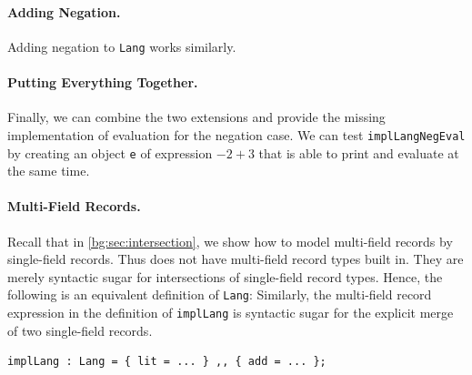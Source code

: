 \paragraph{Adding Negation.}
Adding negation to \lstinline{Lang} works similarly.



\paragraph{Putting Everything Together.}
Finally, we can combine the two extensions and provide the missing
implementation of evaluation for the negation case.
We can test \lstinline{implLangNegEval} by creating an object \lstinline{e} of expression $-2 + 3$ that is able to print and evaluate at the same time.



\paragraph{Multi-Field Records.}
Recall that in \cref{bg:sec:intersection}, we show how to model multi-field records by
single-field records. Thus \namee does not have multi-field record types built in.
They are merely syntactic sugar for intersections of single-field record types.
Hence, the following is an equivalent definition of \lstinline{Lang}:
Similarly, the multi-field record expression in the definition of
\lstinline{implLang} is syntactic sugar for the explicit merge of two
single-field records.
\begin{lstlisting}
implLang : Lang = { lit = ... } ,, { add = ... };
\end{lstlisting}

